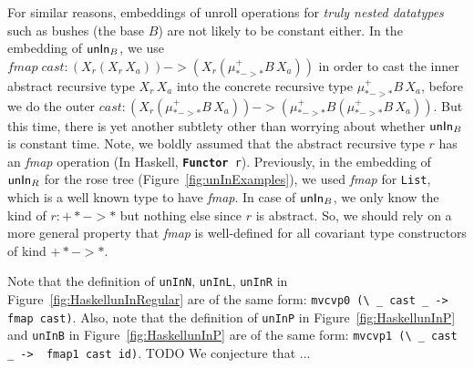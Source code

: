 For similar reasons, embeddings of unroll operations for
\emph{truly nested datatypes} \cite{AbeMatUus05} such as bushes
(the base $B$) are not likely to be constant either.
In the embedding of $\mathsf{unIn}_B$, we use
$\textit{fmap}\;\textit{cast}: (X_r(X_r\,X_a)) -> (X_r(\mu^{+}_{* -> *}B\,X_a))$
in order to cast the inner abstract recursive type $X_r\,X_a$ into
the concrete recursive type $\mu^{+}_{* -> *}B\,X_a$, before we do the outer
$\textit{cast} : (X_r(\mu^{+}_{* -> *}B\,X_a)) ->
                 (\mu^{+}_{* -> *}B(\mu^{+}_{* -> *}B\,X_a))$.
But this time, there is yet another subtlety other than worrying about
whether $\mathsf{unIn}_B$ is constant time. Note, we boldly assumed that
the abstract recursive type $r$ has an \textit{fmap} operation
(In Haskell, \texttt{{\bf\ttfamily Functor} r}). Previously, in the embedding
of $\mathsf{unIn}_R$ for the rose tree (Figure~\ref{fig:unInExamples}), we used
\textit{fmap} for \texttt{List}, which is a well known type to have
\textit{fmap}. In case of $\mathsf{unIn}_B$, we only know the kind of $r : +* -> *$
but nothing else since $r$ is abstract. So, we should rely on a more general
property that \textit{fmap} is well-defined for all covariant type constructors
of kind $+* -> *$. 

Note that the definition of \texttt{unInN}, \texttt{unInL}, \texttt{unInR}
in Figure~\ref{fig:HaskellunInRegular} are of the same form:
\lstinline$mvcvp0 (\ _ cast _ ->  fmap cast)$.  Also, note that
the definition of \texttt{unInP} in Figure~\ref{fig:HaskellunInP}
and \texttt{unInB} in Figure~\ref{fig:HaskellunInP} are of the same form:
\lstinline$mvcvp1 (\ _ cast _ ->  fmap1 cast id)$.
TODO We conjecture that ...





